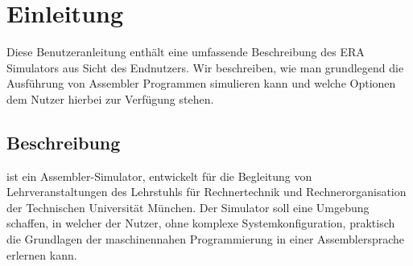 
\section{Einleitung}

Diese Benutzeranleitung enthält eine umfassende Beschreibung des ERA Simulators
aus Sicht des Endnutzers. Wir beschreiben, wie man grundlegend die Ausführung
von Assembler Programmen simulieren kann und welche Optionen dem Nutzer hierbei
zur Verfügung stehen.

\subsection{Beschreibung}

\erasim ist ein Assembler-Simulator, entwickelt für die Begleitung von
Lehrveranstaltungen des Lehrstuhls für Rechnertechnik und Rechnerorganisation
der Technischen Universität München. Der Simulator soll eine Umgebung schaffen,
in welcher der Nutzer, ohne komplexe Systemkonfiguration, praktisch die
Grundlagen der maschinennahen Programmierung in einer Assemblersprache erlernen
kann.

